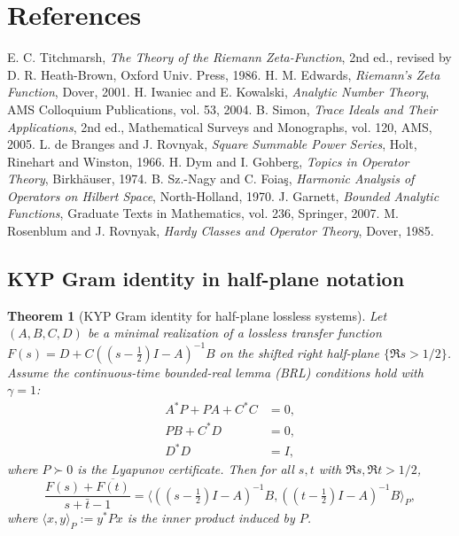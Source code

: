 \documentclass[11pt]{article}
\newtheorem{theorem}{Theorem}
\theoremstyle{definition}
\theoremstyle{remark}
\begin{document}
\section*{References}
\begin{thebibliography}{9}
 E. C. Titchmarsh, \emph{The Theory of the Riemann Zeta-Function}, 2nd ed., revised by D. R. Heath-Brown, Oxford Univ. Press, 1986.
 H. M. Edwards, \emph{Riemann's Zeta Function}, Dover, 2001.
 H. Iwaniec and E. Kowalski, \emph{Analytic Number Theory}, AMS Colloquium Publications, vol. 53, 2004.
 B. Simon, \emph{Trace Ideals and Their Applications}, 2nd ed., Mathematical Surveys and Monographs, vol. 120, AMS, 2005.
 L. de Branges and J. Rovnyak, \emph{Square Summable Power Series}, Holt, Rinehart and Winston, 1966.
 H. Dym and I. Gohberg, \emph{Topics in Operator Theory}, Birkhäuser, 1974.
 B. Sz.-Nagy and C. Foia\c{s}, \emph{Harmonic Analysis of Operators on Hilbert Space}, North-Holland, 1970.
 J. Garnett, \emph{Bounded Analytic Functions}, Graduate Texts in Mathematics, vol. 236, Springer, 2007.
 M. Rosenblum and J. Rovnyak, \emph{Hardy Classes and Operator Theory}, Dover, 1985.
\end{thebibliography}

\subsection{KYP Gram identity in half-plane notation}\label{app:KYP-gram}

\begin{theorem}[KYP Gram identity for half-plane lossless systems]\label{thm:KYP-gram-appendix}
Let $(A, B, C, D)$ be a minimal realization of a lossless transfer function $F(s) = D + C((s-\tfrac12)I - A)^{-1}B$ on the shifted right half-plane $\{\Re s > 1/2\}$. Assume the continuous-time bounded-real lemma (BRL) conditions hold with $\gamma = 1$:
\begin{align}
  A^* P + P A + C^* C &= 0, \label{eq:brl1}\\
  P B + C^* D &= 0, \label{eq:brl2}\\
  D^* D &= I, \label{eq:brl3}
\end{align}
where $P \succ 0$ is the Lyapunov certificate. Then for all $s, t$ with $\Re s, \Re t > 1/2$,
\[
  \frac{F(s) + \overline{F(t)}}{s + \bar t - 1} = \langle ((s-\tfrac12)I - A)^{-1}B, ((t-\tfrac12)I - A)^{-1}B \rangle_P,
\]
where $\langle x, y \rangle_P := y^* P x$ is the inner product induced by $P$.
\end{theorem}
\end{document}
